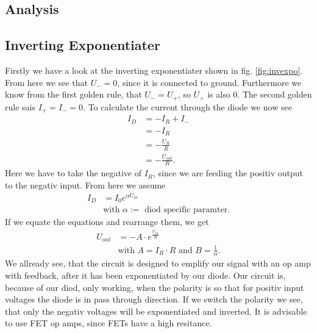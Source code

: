 \documentclass[a4paper,10pt]{article}
\numberwithin{equation}{section}
\begin{document}
\begin{multicols}{2}
	\clearpage
	\section{Analysis}
	\subsection{Inverting Exponentiater}
	Firstly we have a look at the inverting exponentiater shown in fig. \ref{fig:invexpo}. From here we see that $U_{-}=0$, since it is connected to ground. Furthermore we know from the first golden rule, that $U_{-}=U_{+}$, so $U_{+}$ is also 0. The second golden rule sais $I_{+}=I_{-}=0$. To calculate the current through the diode we now see
	\begin{align*}
		I_D & =-I_R+I_{-}          \\
		    & =-I_R                \\
		    & =-\frac{U_R}{R}      \\
		    & =-\frac{U_{out}}{R}.
	\end{align*}
	Here we have to take the negative of $I_R$, since we are feeding the positiv output to the negativ input.
	From here we assume
	\begin{align*}
		I_D & =I_0e^{\alpha U_{in}}                                \\
		    & \text{with } \alpha:=\text{ diod specific paramter.}
	\end{align*}
	If we equate the equations and rearrange them, we get
	\begin{align*}
		U_{out} & =-A\cdot e^{\frac{U_{in}}{B}}                              \\
		        &\text{with }A=I_R\cdot R \text{ and } B=\frac{1}{\alpha}.
	\end{align*}
	We allready see, that the circuit is designed to emplify our signal with an op amp with feedback, after it has been exponentiated by our diode. Our circuit is, because of our diod, only working, when the polarity is so that for positiv input voltages the diode is in pass through direction. If we switch the polarity we see, that only the negativ voltages will be exponentiated and inverted. It is advisable to use FET op amps, since FETs have a high resitance.


\end{multicols}
\end{document}
